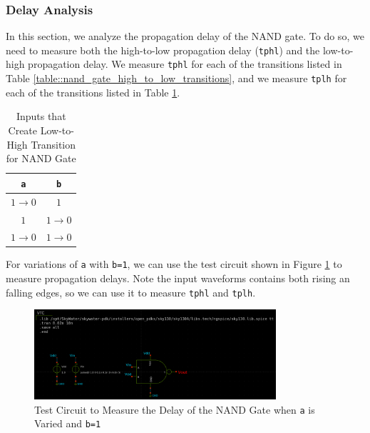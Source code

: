 \documentclass[fleqn]{article}
\begin{document}
	\subsubsection{Delay Analysis}
	
	In this section, we analyze the propagation delay of the NAND gate. To do so, we need to measure both the high-to-low propagation delay (\texttt{tphl}) and the low-to-high propagation delay. We measure \texttt{tphl} for each of the transitions listed in Table \ref{table::nand_gate_high_to_low_transitions}, and we measure \texttt{tplh} for each of the transitions listed in Table \ref{table::nand_gate_low_to_high_transitions}.
	
	\begin{table}[H]
	\begin{center}
	\caption{Inputs that Create Low-to-High Transition for NAND Gate}
	\label{table::nand_gate_low_to_high_transitions}
	\begin{tabular}{| c | c |}
		\hline
		\texttt{a} & \texttt{b} \\
		\hline	
		$1 \rightarrow 0$ & $1$\\
		\hline	
		$1$ & $1 \rightarrow 0$\\
		\hline	
		$1 \rightarrow 0$ & $1 \rightarrow 0$\\
		\hline
	\end{tabular}
	\end{center}
	\end{table}
	
	\noindent For variations of \texttt{a} with \texttt{b=1}, we can use the test circuit shown in Figure \ref{fig::nand_delay_test_sweep_va} to measure propagation delays. Note the input waveforms contains both rising an falling edges, so we can use it to measure \texttt{tphl} and \texttt{tplh}.

	\begin{figure}[H]
		\centerline{\includegraphics[width=0.8\textwidth]{nand_delay_test_sweep_va.png}}
		\caption{Test Circuit to Measure the Delay of the NAND Gate when \texttt{a} is Varied and \texttt{b=1}}
		\label{fig::nand_delay_test_sweep_va}
	\end{figure}
	
\end{document}
